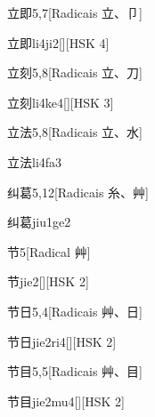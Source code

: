 \begin{entry}{立即}{5,7}[Radicais ⽴、⼙]
  \begin{phonetics}{立即}{li4ji2}[][HSK 4]
  \end{phonetics}
\end{entry}

\begin{entry}{立刻}{5,8}[Radicais ⽴、⼑]
  \begin{phonetics}{立刻}{li4ke4}[][HSK 3]
  \end{phonetics}
\end{entry}

\begin{entry}{立法}{5,8}[Radicais ⽴、⽔]
  \begin{phonetics}{立法}{li4fa3}
  \end{phonetics}
\end{entry}

\begin{entry}{纠葛}{5,12}[Radicais ⽷、⾋]
  \begin{phonetics}{纠葛}{jiu1ge2}
  \end{phonetics}
\end{entry}

\begin{entry}{节}{5}[Radical ⾋]
  \begin{phonetics}{节}{jie2}[][HSK 2]
  \end{phonetics}
\end{entry}

\begin{entry}{节日}{5,4}[Radicais ⾋、⽇]
  \begin{phonetics}{节日}{jie2ri4}[][HSK 2]
  \end{phonetics}
\end{entry}

\begin{entry}{节目}{5,5}[Radicais ⾋、⽬]
  \begin{phonetics}{节目}{jie2mu4}[][HSK 2]
  \end{phonetics}
\end{entry}

